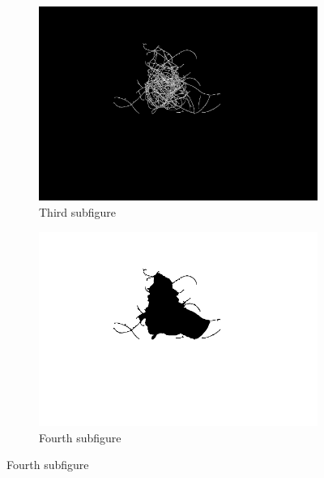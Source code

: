\documentclass[german,a4paper, 12pt]{scrartcl}
\begin{document}
\begin{figure}[H]
	\medskip
	\begin{subfigure}{0.48\textwidth}
		\includegraphics[width=\linewidth]{figBina/08input intensity.png}
		\caption{Third subfigure} \label{fig:c}
	\end{subfigure}\hspace*{\fill}
	\begin{subfigure}{0.48\textwidth}
		\includegraphics[width=\linewidth]{figBina/08outer section.png}
		\caption{Fourth subfigure} \label{fig:d}
	\end{subfigure}
	

\end{figure}
\end{document}
